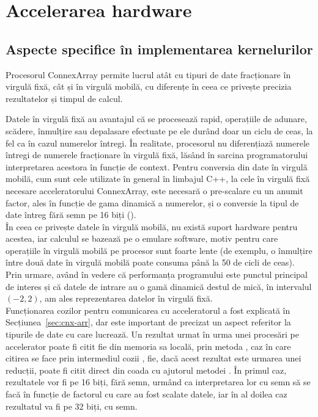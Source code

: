 \chapter{Accelerarea hardware}
\label{chapter:acc}

\section{Aspecte specifice în implementarea kernelurilor}
\label{sec:kernel-aspects}

Procesorul ConnexArray permite lucrul atât cu tipuri de date fracționare în
virgulă fixă, cât și în virgulă mobilă, cu diferențe în ceea ce privește
precizia rezultatelor și timpul de calcul. 

Datele în virgulă fixă au avantajul că se procesează rapid, operațiile de
adunare, scădere, înmulțire sau depalasare efectuate pe ele durând doar un ciclu
de ceas, la fel ca în cazul numerelor întregi. În realitate, procesorul nu
diferențiază numerele întregi de numerele fracționare în virgulă fixă, lăsând în
sarcina programatorului interpretarea acestora în funcție de context. Pentru
conversia din date în virgulă mobilă, cum sunt cele utilizate în general în
limbajul C++, la cele în virgulă fixă necesare acceleratorului ConnexArray, este
necesară o pre-scalare cu un anumit factor, ales în funcție de gama dinamică a
numerelor, și o conversie la tipul de date întreg fără semn pe 16 biți
(). \\

În ceea ce privește datele în virgulă mobilă, nu există suport hardware pentru
acestea, iar calculul se bazează pe o emulare software, motiv pentru care
operațiile în virgulă mobilă pe procesor sunt foarte lente (de exemplu, o
înmulțire între două date în virgulă mobilă poate consuma până la 50 de cicli de
ceas). \\

Prin urmare, având în vedere că performanța programului este punctul principal
de interes și că datele de intrare au o gamă dinamică destul de mică, în
intervalul $(-2, 2)$, am ales reprezentarea datelor în virgulă fixă. \\

Funcționarea cozilor pentru comunicarea cu acceleratorul a fost explicată în
Secțiunea~\ref{sec:cnx-arr}, dar este important de precizat un aspect
referitor la tipurile de date cu care lucrează. Un rezultat urmat în urma unei
procesări pe accelerator poate fi citit fie din memoria sa locală, prin metoda
, caz în care citirea se face prin intermediul cozii
, fie, dacă acest rezultat este urmarea unei reducții,
poate fi citit direct din coada  cu ajutorul metodei
. În primul caz, rezultatele vor fi pe 16 biți, fără semn,
urmând ca interpretarea lor cu semn să se facă în funcție de factorul cu care au
fost scalate datele, iar în al doilea caz rezultatul va fi pe 32 biți, cu semn. \\

